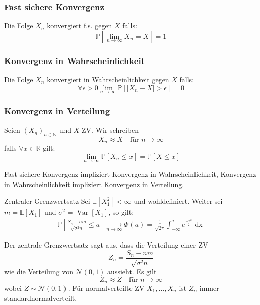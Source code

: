 \documentclass[a4paper,10pt]{article}
\def\R{\mathbb{R}}
\def\P{\mathbb{P}}
\def\E{\mathbb{E}}
\DeclareMathOperator{\Var}{\text{Var}}
\begin{document}
\subsubsection*{Fast sichere Konvergenz}

Die Folge $X_n$ konvergiert f.s. gegen $X$ falls:
$$
	\P \left[ \lim_{n \to \infty} X_n = X \right] = 1
$$

\subsubsection*{Konvergenz in Wahrscheinlichkeit}

Die Folge $X_n$ konvergiert in Wahrscheinlichkeit gegen $X$ falls:
$$
	\forall \epsilon > 0 \lim_{n \to \infty} \P \left[ \left| X_n - X \right| > \epsilon \right] = 0
$$

\subsubsection*{Konvergenz in Verteilung}
Seien \((X_n)_{n\in \mathbb{N}}\) und \(X\) ZV. Wir schreiben
\[X_n \approx X \quad \text{für } n \to \infty\]
falls \(\forall x \in \R\) gilt:
\[\lim_{n\to\infty} \P[X_n \le x] = \P[X \le x ]\]

Fast sichere Konvergenz impliziert Konvergenz in Wahrscheinlichkeit, Konvergenz in Wahrscheinlichkeit impliziert Konvergenz in Verteilung.

\begin{mainbox}{Zentraler Grenzwertsatz}
	Sei \(\E[X^2_1] < \infty\) und wohldefiniert. Weiter sei \(m = \E[X_1]\) und \(\sigma^2 = \Var[X_1]\), so gilt:
	\begin{align*}
		\P\left[\frac{S_n - nm}{\sqrt{\sigma^2 n}} \leq a\right] \xrightarrow[n \to \infty]{} \Phi(a) = \frac{1}{\sqrt{2 \pi}} \int_{-\infty}^a e^{\frac{-x^2}{2}} \mathop{dx}
	\end{align*}
\end{mainbox}
Der zentrale Grenzwertsatz sagt aus, dass die Verteilung einer ZV
\[Z_n = \frac{S_n - nm}{\sqrt{\sigma^2 n}}\]
wie die Verteilung von \(\mathcal{N}(0,1)\) aussieht. Es gilt
\[Z_n \approx Z \quad \text{für } n\to \infty\]
wobei \(Z \sim \mathcal{N}(0,1)\). Für normalverteilte ZV \(X_1, \ldots, X_n\) ist \(Z_n\) immer standardnormalverteilt.
\end{document}
